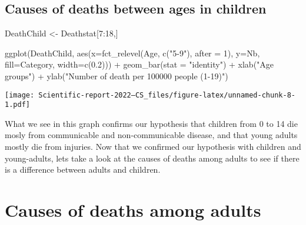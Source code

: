 \documentclass[
]{article}
\newenvironment{Shaded}{\begin{snugshade}}{\end{snugshade}}
\newcommand{\AttributeTok}[1]{\textcolor[rgb]{0.77,0.63,0.00}{#1}}
\newcommand{\DecValTok}[1]{\textcolor[rgb]{0.00,0.00,0.81}{#1}}
\newcommand{\FloatTok}[1]{\textcolor[rgb]{0.00,0.00,0.81}{#1}}
\newcommand{\FunctionTok}[1]{\textcolor[rgb]{0.00,0.00,0.00}{#1}}
\newcommand{\NormalTok}[1]{#1}
\newcommand{\OtherTok}[1]{\textcolor[rgb]{0.56,0.35,0.01}{#1}}
\newcommand{\SpecialCharTok}[1]{\textcolor[rgb]{0.00,0.00,0.00}{#1}}
\newcommand{\StringTok}[1]{\textcolor[rgb]{0.31,0.60,0.02}{#1}}
\begin{document}
\hypertarget{causes-of-deaths-between-ages-in-children}{%
\subsection{Causes of deaths between ages in
children}\label{causes-of-deaths-between-ages-in-children}}

\begin{Shaded}
\begin{Highlighting}[]
\NormalTok{DeathChild }\OtherTok{\textless{}{-}}\NormalTok{ Deathstat[}\DecValTok{7}\SpecialCharTok{:}\DecValTok{18}\NormalTok{,]}

\FunctionTok{ggplot}\NormalTok{(DeathChild, }\FunctionTok{aes}\NormalTok{(}\AttributeTok{x=}\FunctionTok{fct\_relevel}\NormalTok{(Age, }\FunctionTok{c}\NormalTok{(}\StringTok{"5{-}9"}\NormalTok{), }\AttributeTok{after =} \DecValTok{1}\NormalTok{), }\AttributeTok{y=}\NormalTok{Nb, }\AttributeTok{fill=}\NormalTok{Category, }\AttributeTok{width=}\FunctionTok{c}\NormalTok{(}\FloatTok{0.2}\NormalTok{))) }\SpecialCharTok{+}
  \FunctionTok{geom\_bar}\NormalTok{(}\AttributeTok{stat =} \StringTok{"identity"}\NormalTok{) }\SpecialCharTok{+}
  \FunctionTok{xlab}\NormalTok{(}\StringTok{"Age groups"}\NormalTok{) }\SpecialCharTok{+} 
  \FunctionTok{ylab}\NormalTok{(}\StringTok{"Number of death per 100\textquotesingle{}000 people (1{-}19)"}\NormalTok{)}
\end{Highlighting}
\end{Shaded}

\texttt{[image: Scientific-report-2022---CS\_files/figure-latex/unnamed-chunk-8-1.pdf]}

What we see in this graph confirms our hypothesis that children from 0
to 14 die mosly from communicable and non-communicable disease, and that
young adults mostly die from injuries. Now that we confirmed our
hypothesis with children and young-adults, lets take a look at the
causes of deaths among adults to see if there is a difference between
adults and children.

\hypertarget{causes-of-deaths-among-adults}{%
\section{Causes of deaths among
adults}\label{causes-of-deaths-among-adults}}
\end{document}

